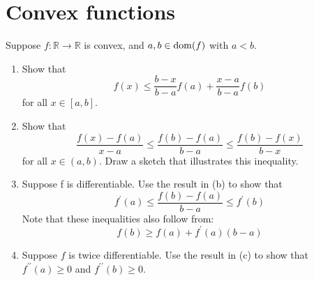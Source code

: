 \section{Convex functions}
\begin{problem}[3.1]
    Suppose $f: \mathbb{R} \to \mathbb{R}$ is convex, and $a, b \in \operatorname{dom}(f)$ with $a < b$.
    \begin{enumerate}
        \item Show that \[f(x) \le \frac{b - x}{b - a}f(a) + \frac{x - a}{b - a}f(b)\] for all $x \in [a, b]$.
        \item Show that \[\frac{f(x) - f(a)}{x - a} \le \frac{f(b) - f(a)}{b - a} \le \frac{f(b) - f(x)}{b - x}\] for all $x \in (a, b)$. Draw a sketch that illustrates this inequality. 
        \item Suppose f is differentiable. Use the result in (b) to show that \[f^\prime(a) \le \frac{f(b) - f(a)}{b - a} \le f^\prime(b)\] Note that these inequalities also follow from:\[f(b) \ge f(a) + f^\prime(a)(b - a) \]
        \item Suppose $f$ is twice differentiable. Use the result in (c) to show that $f^{\prime \prime}(a) \geq 0$ and $f^{\prime \prime}(b) \geq 0$.
    \end{enumerate}


\end{problem}
